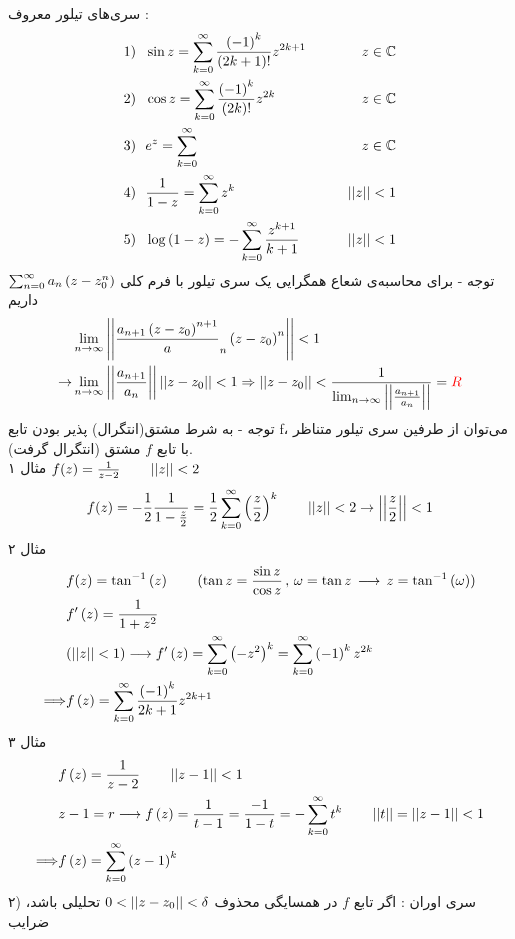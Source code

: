 سری‌های تیلور معروف :
\[\begin{aligned}
	&1) \ \ \sin z=\sum_{k=0}^\infty \frac{\left(-1\right)^k}{\left(2k+1\right)!}z^{2k+1} \qquad &z\in\mathbb{C}
	\\
	&2) \ \ \cos z=\sum_{k=0}^\infty \frac{\left(-1\right)^k}{\left(2k\right)!}z^{2k} \qquad &z\in\mathbb{C}
	\\
	&3) \ \ e^z=\sum_{k=0}^\infty \qquad & z\in\mathbb{C}
	\\
	&4) \ \ \frac{1}{1-z}=\sum_{k=0}^\infty z^k \qquad & \left|\left| z \right|\right|<1
	\\
	&5) \ \ \log\left(1-z\right)=-\sum_{k=0}^\infty \frac{z^{k+1}}{k+1}\qquad &\left|\left| z \right|\right|<1
\end{aligned}\]
توجه - برای محاسبه‌ی شعاع همگرایی یک سری تیلور با فرم کلی
$\sum_{n=0}^\infty a_n\left(z-z_0^n\right)$
داریم
\[\begin{aligned}
	& \lim_{n\to\infty}\left|\left| \frac{a_{n+1}\left(z-z_0\right)^{n+1}}a_n\left(z-z_0\right)^n \right|\right|<1
	\\ \rightarrow &
	\lim_{n\to\infty} \left|\left| \frac{a_{n+1}}{a_n} \right|\right|\left|\left| z-z_0 \right|\right|<1\Rightarrow \left|\left| z-z_0 \right|\right|<\frac1{\lim_{n\to\infty}\left|\left| \frac{a_{n+1}}{a_n} \right|\right|}=\textcolor{red}{R}
\end{aligned}\]
توجه - به شرط مشتق(انتگرال) پذیر بودن تابع f، می‌توان از طرفین سری تیلور متناظر با تابع
$f$
مشتق (انتگرال گرفت).\\
مثال ۱
\hfill
$f(z)=\frac1{z-2}\qquad\left|\left| z \right|\right|<2$
\[
f(z)=-\frac12\frac1{1-\frac z2}=\frac12\sum_{k=0}^\infty \left(\frac z2\right)^k \qquad \left|\left| z \right|\right|<2\rightarrow \left|\left| \frac z2 \right|\right|<1
\]
مثال ۲
\[\begin{aligned}
	& f(z)=\tan^{-1}\left(z\right) \qquad(\tan z=\frac{\sin z}{\cos z}\, , \, \omega=\tan z \, \longrightarrow \, z=\tan^{-1}\left(\omega\right))
	\\ &
	f^\prime\left(z\right)=\frac1{1+z^2}
	\\ &
	(\left|\left| z \right|\right|<1)\longrightarrow f^\prime\left(z\right)=\sum_{k=0}^\infty \left(-z^2\right)^k=\sum_{k=0}^\infty \left(-1\right)^k z^{2k}
	\\ \Longrightarrow &
	f\left(z\right)=\sum_{k=0}^\infty \frac{\left(-1\right)^k}{2k+1}z^{2k+1}
\end{aligned}\]
مثال ۳
\[\begin{aligned}
	&
	f\left(z\right)=\frac1{z-2}\qquad\left|\left| z-1 \right|\right|<1
	\\ &
	z-1=r\longrightarrow f\left(z\right)=\frac1{t-1}=\frac{-1}{1-t}=-\sum_{k=0}^\infty t^k \qquad \left|\left| t \right|\right|=\left|\left| z-1 \right|\right|<1
	\\ \Longrightarrow & f\left(z\right)=\sum_{k=0}^\infty \left(z-1\right)^k
\end{aligned}\]
۲) سری اوران : اگر تابع $f$ در همسایگی محذوف
$0<\left|\left| z-z_0 \right|\right|<\delta$
تحلیلی باشد، ضرایب
